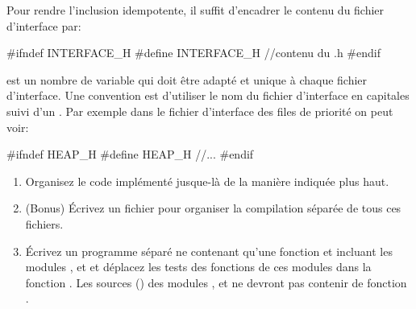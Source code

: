 \documentclass[a4paper, 10pt]{article}
\begin{document}
\smallbreak
Pour rendre l'inclusion idempotente, il suffit d'encadrer le contenu du fichier d'interface par:
\begin{ccode}
#ifndef INTERFACE_H
#define INTERFACE_H
//contenu du .h
#endif
\end{ccode}
 est un nombre de variable qui doit être adapté et unique à chaque fichier d'interface. Une convention est d'utiliser le nom du fichier d'interface en capitales suivi d'un . Par exemple dans le fichier d'interface des files de priorité on peut voir:
\begin{ccode}
#ifndef HEAP_H
#define HEAP_H
//...
#endif
\end{ccode}
\begin{enumerate}[resume]
\item Organisez le code implémenté jusque-là de la manière indiquée plus haut.
\item (Bonus) Écrivez un fichier  pour organiser la compilation séparée de tous ces fichiers.
\item Écrivez un programme séparé ne contenant qu'une fonction  et incluant les modules ,  et  et déplacez les tests des fonctions de ces modules dans la fonction . Les sources () des modules ,  et  ne devront pas contenir de fonction .
\end{enumerate}
\end{document}
